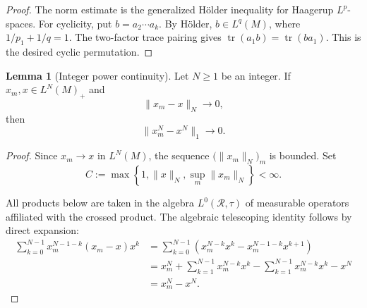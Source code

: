 \documentclass[11pt,a4paper]{article}
\theoremstyle{plain}
\numberwithin{theorem}{section}
\theoremstyle{definition}
\newtheorem{lemma}[theorem]{Lemma}
\newcommand{\?}{\overset{?}{=}}
\newcommand{\cR}{\mathcal{R}}
\begin{document}
\begin{appendix}
\begin{proof}
The norm estimate is the generalized H\"older inequality for Haagerup
\(L^p\)-spaces.  For cyclicity, put \(b=a_2\cdots a_k\).  By H\"older,
\(b\in L^q(M)\), where \(1/p_1+1/q=1\).  The two-factor trace pairing gives
\(\operatorname{tr}(a_1b)=\operatorname{tr}(ba_1)\).  This is the desired
cyclic permutation.
\end{proof}

\begin{lemma}[Integer power continuity]
\label{lem:integer-power-continuity}
Let \(N\geq 1\) be an integer. If \(x_m,x\in L^N(M)_+\) and
\begin{equation*}
    \|x_m-x\|_N\longrightarrow 0,
\end{equation*}
then
\begin{equation*}
    \|x_m^N-x^N\|_1\longrightarrow 0.
\end{equation*}
\end{lemma}

\begin{proof}
Since \(x_m\to x\) in \(L^N(M)\), the sequence
\(\bigl(\|x_m\|_N\bigr)_m\) is bounded. Set
\begin{equation*}
    C
    :=
    \max\left\{
        1,\|x\|_N,\sup_m\|x_m\|_N
    \right\}
    <\infty.
\end{equation*}

All products below are taken in the algebra
\(L^0(\cR,\tau)\) of measurable operators affiliated with the crossed
product. The algebraic telescoping identity follows by direct
expansion:
\begin{align*}
    \sum_{k=0}^{N-1}
        x_m^{N-1-k}(x_m-x)x^k
    &=
    \sum_{k=0}^{N-1}
        \left(
            x_m^{N-k}x^k
            -
            x_m^{N-1-k}x^{k+1}
        \right)
    \\
    &=
    x_m^N
    +
    \sum_{k=1}^{N-1}x_m^{N-k}x^k
    -
    \sum_{k=1}^{N-1}x_m^{N-k}x^k
    -
    x^N
    \\
    &=x_m^N-x^N.
\end{align*}


\end{proof}
\end{appendix}
\end{document}
